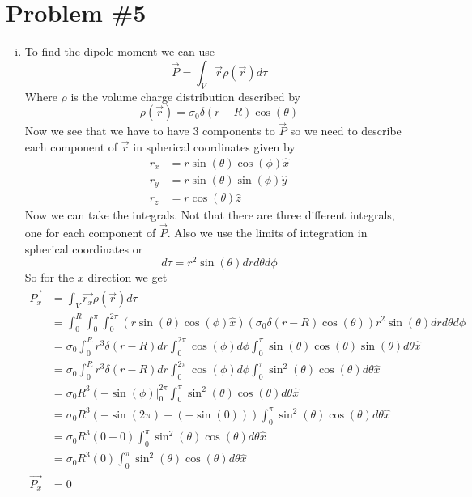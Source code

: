 \documentclass[11pt]{article}
\numberwithin{equation}{section}
\begin{document}
\section{Problem \#5}
\begin{enumerate}[(i)]
\item
To find the dipole moment we can use
$$\vec{P} = \int_V\vec{r}\rho(\vec{r})d\tau$$
Where $\rho$ is the volume charge distribution described by 
$$\rho(\vec{r}) = \sigma_0\delta(r-R)\cos(\theta)$$
Now we see that we have to have 3 components to $\vec{P}$ so we need to describe each component of $\vec{r}$ in spherical coordinates given by
\begin{align*}
r_x&=r\sin(\theta)\cos(\phi)\hat{x}\\
r_y&=r\sin(\theta)\sin(\phi)\hat{y}\\
r_z&=r\cos(\theta)\hat{z}
\end{align*}
Now we can take the integrals. Not that there are three different integrals, one for each component of $\vec{P}$. Also we use the limits of integration in spherical coordinates or
$$d\tau = r^2\sin(\theta)drd\theta d\phi$$
So for the $x$ direction we get
\begin{align*}
\vec{P_x} &= \int_V\vec{r_x}\rho(\vec{r})d\tau\\
 &= \int_0^R\int_0^{\pi}\int_0^{2\pi}(r\sin(\theta)\cos(\phi)\hat{x})(\sigma_0\delta(r-R)\cos(\theta))r^2\sin(\theta)drd\theta d\phi\\
 &= \sigma_0\int_0^Rr^3\delta(r-R)dr\int_0^{2\pi}\cos(\phi) d\phi\int_0^{\pi}\sin(\theta)\cos(\theta)\sin(\theta)d\theta\hat{x}\\
 &= \sigma_0\int_0^Rr^3\delta(r-R)dr\int_0^{2\pi}\cos(\phi) d\phi\int_0^{\pi}\sin^2(\theta)\cos(\theta)d\theta\hat{x}\\
 &= \sigma_0R^3\left(-\sin(\phi)\right|_0^{2\pi}\int_0^{\pi}\sin^2(\theta)\cos(\theta)d\theta\hat{x}\\
 &= \sigma_0R^3\left(-\sin(2\pi)-(-\sin(0))\right)\int_0^{\pi}\sin^2(\theta)\cos(\theta)d\theta\hat{x}\\
 &= \sigma_0R^3\left(0-0\right)\int_0^{\pi}\sin^2(\theta)\cos(\theta)d\theta\hat{x}\\
 &= \sigma_0R^3\left(0\right)\int_0^{\pi}\sin^2(\theta)\cos(\theta)d\theta\hat{x}\\
\vec{P_x}&=0
\end{align*}


\end{enumerate}
\end{document}
